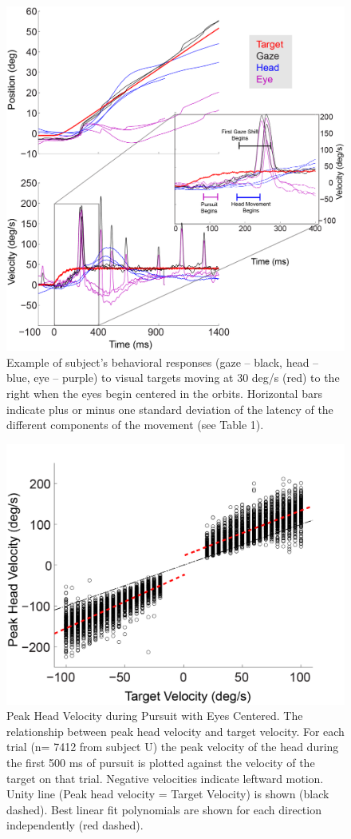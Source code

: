 \documentclass[12pt]{article}
\begin{document}
\begin{figure}[h]
\centering
\includegraphics[width=0.7\linewidth]{./figs/CenterIEP}
\caption[Gaze Pursuit with Eyes Centered]{Example of subject’s behavioral responses (gaze – black, head – blue, eye – purple) to visual targets moving at 30 deg/s (red) to the right when the eyes begin centered in the orbits. Horizontal bars indicate plus or minus one standard deviation of the latency of the different components of the movement (see Table 1).
}
\label{fig:CenterIEP}
\end{figure}


\begin{figure}[h]
\centering
\includegraphics[width=0.7\linewidth]{./figs/CenterRegression}
\caption[Peak Head Velocity during Pursuit with Eyes Centered.]{Peak Head Velocity during Pursuit with Eyes Centered. The relationship between peak head velocity and target velocity. For each trial (n= 7412 from subject U) the peak velocity of the head during the first 500 ms of pursuit is plotted against the velocity of the target on that trial. Negative velocities indicate leftward motion. Unity line (Peak head velocity = Target Velocity) is shown (black dashed). Best linear fit polynomials are shown for each direction independently (red dashed).}
\label{fig:CenterRegression}
\end{figure}
\end{document}
